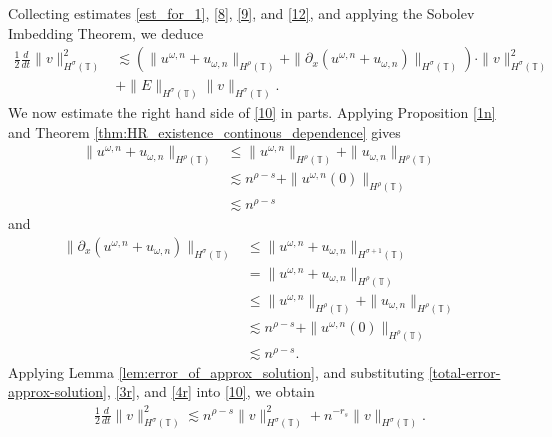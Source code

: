 \documentclass[12pt,reqno]{amsart}
\newcommand{\p}{\partial}
\newcommand{\ci}{\mathbb{T}}
\theoremstyle{plain}  %
\theoremstyle{definition}
\begin{document}
Collecting estimates \eqref{est_for_1}, \eqref{8}, \eqref{9}, and
\eqref{12}, and applying the Sobolev Imbedding Theorem, we deduce
\begin{equation}
	\begin{split}
		\frac{1}{2}\frac{d}{dt} \|v\|_{H^\sigma(\ci)}^2
		& \lesssim
		(\|u^{\omega,n} + u_{\omega,n}\|_{H^{\rho}(\ci)} +
		\|\p_x(u^{\omega,n} + u_{\omega,n}) \|_{H^\sigma(\ci)})
		\cdot \|v\|_{H^\sigma(\ci)}^2
		\\
		& + \|E\|_{H^\sigma(\ci)}
		\|v\|_{H^\sigma(\ci)}.
		\label{10}
	\end{split}
\end{equation}
We now estimate the right hand side of \eqref{10} in parts. Applying
Proposition \ref{1n} and Theorem \ref{thm:HR_existence_continous_dependence} 
gives
\begin{equation}
	\begin{split}
		 \|u^{\omega,n} + u_{\omega,n} \|_{H^\rho(\ci)}
		 & \le
		\|u^{\omega,n}\|_{H^\rho(\ci)} + \|u_{\omega,n}\|_{H^\rho(\ci)}
		\\
		& \lesssim n^{\rho -s} + \|u^{\omega,n}(0)\|_{H^\rho(\ci)}
		\\
		& \lesssim n^{\rho -s}
		\label{3r}
	\end{split}
\end{equation}
and
\begin{equation}
	\begin{split}
		\|\p_x(u^{\omega,n} + u_{\omega,n}) \|_{H^\sigma(\ci)} 
		& \le \|u^{\omega,n} + u_{\omega,n}\|_{H^{\sigma + 1}(\ci)}
		\\
		& = \|u^{\omega,n} + u_{\omega,n}\|_{H^{\rho}(\ci)}
		\\
		& \le \|u^{\omega,n} \|_{H^{\rho}(\ci)} + \|u_{\omega,n}
		\|_{H^{\rho}(\ci)}
		\\
		& \lesssim n^{\rho -s} + \|u^{\omega,n}(0)\|_{H^{\rho}(\ci)}
		\\
		& \lesssim n^{\rho -s}.
		\label{4r}
	\end{split}
\end{equation}
Applying Lemma \ref{lem:error_of_approx_solution}, and
substituting \eqref{total-error-approx-solution}, \eqref{3r},
and \eqref{4r} into \eqref{10}, we obtain
\begin{equation}
	\begin{split}
		\frac{1}{2}\frac{d}{dt}\|v\|_{H^\sigma(\ci)}^2 \lesssim n^{\rho - s}
		\|v\|_{H^\sigma(\ci)}^2 + n^{-r_s}\|v\|_{H^\sigma(\ci)}.
		\label{200r}
	\end{split}
\end{equation}
\end{document}
